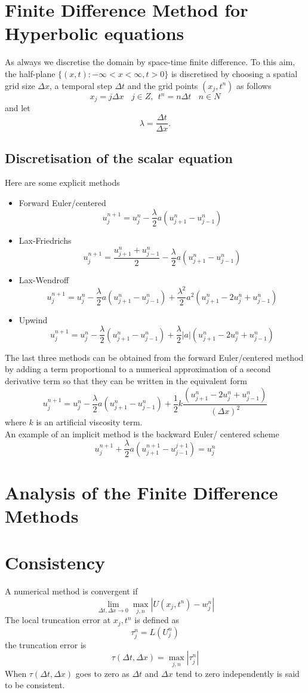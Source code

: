 \section{Finite Difference Method for Hyperbolic equations}
As always we discretise the domain by space-time finite difference.  To this aim,
the half-plane $\{(x,t): -\infty <x<\infty, t>0 \}$ is discretised by choosing
a spatial grid size $\Delta x$, a temporal step $\Delta t$ and the grid
points $(x_j,t^n)$ as follows
\[x_j=j\Delta x  \ \ \ \ j \in Z, \ \ t^n=n\Delta t \ \ \ \ n \in N \]
and let 
\[\lambda =\frac{\Delta t}{\Delta x}. \]
\subsection{Discretisation of the scalar equation }
Here are some explicit methods 
\begin{itemize}
\item
Forward Euler/centered
\[ u^{n+1}_j=u^{n}_{j}-\frac{\lambda}{2}a(u^{n}_{j+1}-u^{n}_{j-1})\]
\item
Lax-Friedrichs
\[ u^{n+1}_j=\frac{u^{n}_{j+1}+u_{j-1}^n}{2}-\frac{\lambda}{2}a(u^{n}_{j+1}-u^{n}_{j-1})\]
\item
Lax-Wendroff
\[ u^{n+1}_j=u^{n}_{j}-\frac{\lambda}{2}a(u^{n}_{j+1}-u^{n}_{j-1})+\frac{\lambda^2}{2}a^2(u^{n}_{j+1}-2u_{j}^n+u^{n}_{j-1})\]
\item
Upwind
\[ u^{n+1}_j=u^{n}_{j}-\frac{\lambda}{2}(u^{n}_{j+1}-u^{n}_{j-1})+\frac{\lambda}{2}|a|(u^{n}_{j+1}-2u_{j}^n+u^{n}_{j-1})
\]
\end{itemize}

The last three methods can be obtained from the forward Euler/centered method by
adding a term proportional to a numerical approximation of a second derivative term so that they can be written in the equivalent form
\[ u^{n+1}_j=u^{n}_{j}-\frac{\lambda}{2}a(u^{n}_{j+1}-u^{n}_{j-1})+\frac{1}{2}k\frac{(u^{n}_{j+1}-2u_{j}^n+u^{n}_{j-1})}{(\Delta x)^2}\]
where $k$ is an artificial viscosity term.\\
An example of an implicit method is the backward Euler/ centered scheme
\[u^{n+1}_j+\frac{\lambda}{2}a(u_{j+1}^{n+1} - u_{j-1}^{j+1})=u_{j}^n \]

\section{Analysis of the Finite Difference Methods}
\section{Consistency}
A numerical method is convergent if 
\[\lim_{\Delta t,\Delta x \rightarrow 0} \max_{j,n}|U(x_j,t^n)-w_j^n| \] 
The local truncation error at $x_j,t^n$ is defined as
\[\tau_j^n = L(U^n_j) \]
the truncation error is 
\[\tau(\Delta t, \Delta x) = \max_{j,n}|\tau^n_j| \]
When $\tau(\Delta t, \Delta x)$ goes to zero as $\Delta t$ and $\Delta x$ tend to
zero independently is said to be consistent.
